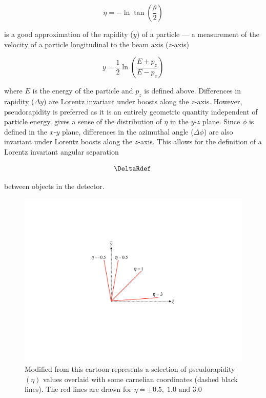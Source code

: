 \begin{equation}
 \eta = -\ln \tan \left( \frac{\theta}{2} \right)
\end{equation}

is a good approximation of the rapidity ($y$) of a particle --- a measurement of
the velocity of a particle longitudinal to the beam axis ($z$-axis)

\begin{equation}
y = \frac{1}{2} \ln \left( \frac{E + p_{z}}{E - p_{z}} \right)
\end{equation}

where $E$ is the energy of the particle and $p_{z}$ is defined above.
Differences in rapidity ($\Delta y$) are Lorentz invariant under boosts along
the $z$-axis.  However, pseudorapidity is preferred as it is an entirely
geometric quantity independent of particle energy. 
gives a sense of the distribution of $\eta$ in the $y$-$z$ plane. Since $\phi$
is defined in the $x$-$y$ plane, differences in the azimuthal angle
($\Delta\phi$) are also invariant under Lorentz boosts along the $z$-axis.
This allows for the definition of a Lorentz invariant angular separation

\begin{equation}
 \DeltaRdef \,
\end{equation}

between objects in the detector.

\begin{figure}[!htbp]
  \begin{center}
    \includegraphics[width=0.5\linewidth]{figures/atlas/pseudorapidity}
    \caption{Modified from \cite{Stark:2317296} this cartoon represents a
selection of pseudorapidity $(\eta)$ values overlaid with some carnelian
coordinates (dashed black lines).  The red lines are drawn for $\eta = \pm
0.5, \; 1.0 \text{ and } 3.0$ }
    \label{fig:pseudorapidity}
  \end{center}
\end{figure}

